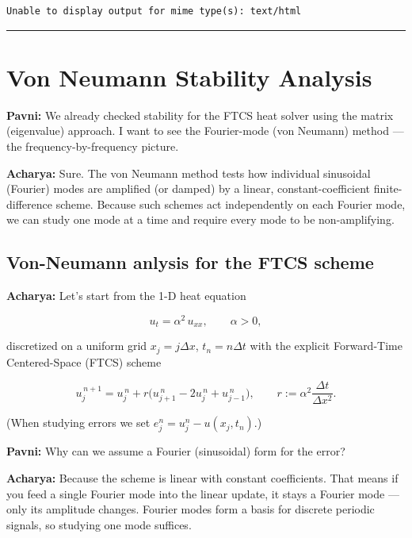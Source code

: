 \documentclass[
  letterpaper,
]{book}
\begin{document}
\begin{verbatim}
Unable to display output for mime type(s): text/html
\end{verbatim}

\begin{center}\rule{0.5\linewidth}{0.5pt}\end{center}


\chapter{Von Neumann Stability
Analysis}\label{von-neumann-stability-analysis}

\textbf{Pavni:} We already checked stability for the FTCS heat solver
using the matrix (eigenvalue) approach. I want to see the Fourier-mode
(von Neumann) method --- the frequency-by-frequency picture.

\textbf{Acharya:} Sure. The von Neumann method tests how individual
sinusoidal (Fourier) modes are amplified (or damped) by a linear,
constant-coefficient finite-difference scheme. Because such schemes act
independently on each Fourier mode, we can study one mode at a time and
require every mode to be non-amplifying.

\section{Von-Neumann anlysis for the FTCS
scheme}\label{von-neumann-anlysis-for-the-ftcs-scheme}

\textbf{Acharya:} Let's start from the 1-D heat equation

\[
u_t = \alpha^2 \, u_{xx}, \qquad \alpha > 0,
\]

discretized on a uniform grid \(x_j = j\Delta x\), \(t_n = n\Delta t\)
with the explicit Forward-Time Centered-Space (FTCS) scheme

\[
u_j^{\,n+1}=u_j^{\,n}+r\big(u_{j+1}^{\,n}-2u_j^{\,n}+u_{j-1}^{\,n}\big),\qquad r:=\alpha^2 \frac{\Delta t}{\Delta x^2}.
\]

(When studying errors we set \(e_j^n = u_j^n - u(x_j,t_n)\).)

\textbf{Pavni:} Why can we assume a Fourier (sinusoidal) form for the
error?

\textbf{Acharya:} Because the scheme is linear with constant
coefficients. That means if you feed a single Fourier mode into the
linear update, it stays a Fourier mode --- only its amplitude changes.
Fourier modes form a basis for discrete periodic signals, so studying
one mode suffices.
\end{document}
